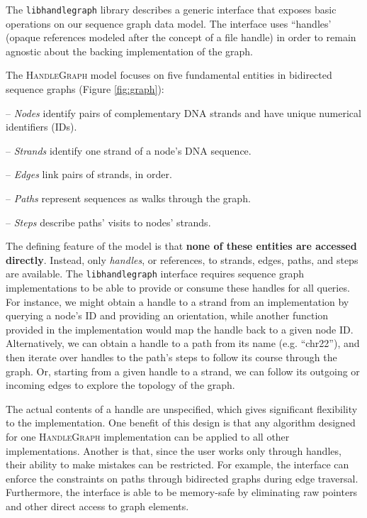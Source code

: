 \documentclass{article}
\begin{document}
The \texttt{libhandlegraph} library describes a generic interface that exposes basic operations on our sequence graph data model.
The interface uses ``handles' (opaque references modeled after the concept of a file handle) in order to remain agnostic about the backing implementation of the graph.

The \textsc{HandleGraph} model focuses on five fundamental entities in bidirected sequence graphs (Figure \ref{fig:graph}):

-- \emph{Nodes} identify pairs of complementary DNA strands and have unique numerical identifiers (IDs).

-- \emph{Strands} identify one strand of a node's DNA sequence.

-- \emph{Edges} link pairs of strands, in order.

-- \emph{Paths} represent sequences as walks through the graph.

-- \emph{Steps} describe paths' visits to nodes' strands.

The defining feature of the model is that \textbf{none of these entities are accessed directly}.
Instead, only \emph{handles}, or references, to strands, edges, paths, and steps are available.
The \texttt{libhandlegraph} interface requires sequence graph implementations to be able to provide or consume these handles for all queries.
For instance, we might obtain a handle to a strand from an implementation by querying a node's ID and providing an orientation, while another function provided in the implementation would map the handle back to a given node ID.
Alternatively, we can obtain a handle to a path from its name (e.g. ``chr22''), and then iterate over handles to the path's steps to follow its course through the graph.
Or, starting from a given handle to a strand, we can follow its outgoing or incoming edges to explore the topology of the graph.


The actual contents of a handle are unspecified, which gives significant flexibility to the implementation.
One benefit of this design is that any algorithm designed for one \textsc{HandleGraph} implementation can be applied to all other implementations.
Another is that, since the user works only through handles, their ability to make mistakes can be restricted.
For example, the interface can enforce the constraints on paths through bidirected graphs during edge traversal.
Furthermore, the interface is able to be memory-safe by eliminating raw pointers and other direct access to graph elements.
\end{document}
